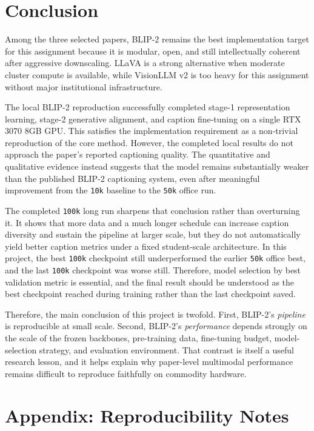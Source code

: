 \documentclass[11pt]{article}
\begin{document}
\section{Conclusion}
Among the three selected papers, BLIP-2 remains the best implementation target for this assignment because it is modular, open, and still intellectually coherent after aggressive downscaling. LLaVA is a strong alternative when moderate cluster compute is available, while VisionLLM v2 is too heavy for this assignment without major institutional infrastructure.

The local BLIP-2 reproduction successfully completed stage-1 representation learning, stage-2 generative alignment, and caption fine-tuning on a single RTX 3070 8GB GPU. This satisfies the implementation requirement as a non-trivial reproduction of the core method. However, the completed local results do not approach the paper's reported captioning quality. The quantitative and qualitative evidence instead suggests that the model remains substantially weaker than the published BLIP-2 captioning system, even after meaningful improvement from the \texttt{10k} baseline to the \texttt{50k} office run.

The completed \texttt{100k} long run sharpens that conclusion rather than overturning it. It shows that more data and a much longer schedule can increase caption diversity and sustain the pipeline at larger scale, but they do not automatically yield better caption metrics under a fixed student-scale architecture. In this project, the best \texttt{100k} checkpoint still underperformed the earlier \texttt{50k} office best, and the last \texttt{100k} checkpoint was worse still. Therefore, model selection by best validation metric is essential, and the final result should be understood as the best checkpoint reached during training rather than the last checkpoint saved.

Therefore, the main conclusion of this project is twofold. First, BLIP-2's \emph{pipeline} is reproducible at small scale. Second, BLIP-2's \emph{performance} depends strongly on the scale of the frozen backbones, pre-training data, fine-tuning budget, model-selection strategy, and evaluation environment. That contrast is itself a useful research lesson, and it helps explain why paper-level multimodal performance remains difficult to reproduce faithfully on commodity hardware.

\appendix
\section{Appendix: Reproducibility Notes}
\end{document}
